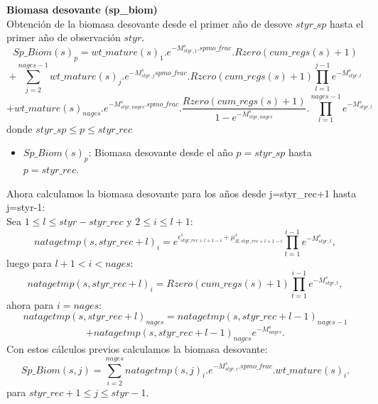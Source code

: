 \documentclass{article}
\begin{document}
\textbf{Biomasa desovante (sp\_biom)}\\
Obtención de la biomasa desovante desde el primer año de desove $styr\_sp$ hasta el primer año de observación $styr$.
\begin{equation}
    Sp\_Biom(s)_p=wt\_mature(s)_1.e^{-M^s_{styr,1}.spmo\_frac}.Rzero(cum\_regs(s)+1)
\end{equation}
\begin{equation*}
    +\sum_{j=2}^{nages-1}wt\_mature(s)_j.e^{-M^s_{styr,j} spmo\_frac}.Rzero(cum\_regs(s)+1)\prod_{l=1}^{j-1}e^{-M^s_{styr,l}} 
\end{equation*}
\begin{equation*}
    + wt\_mature(s)_{nages}.e^{-M^s_{styr,nages}.spmo\_frac}.\dfrac{Rzero(cum\_regs(s)+1)}{1-e^{-M^s_{styr,nages}}}.\prod_{l=1}^{nages-1}e^{-M^s_{styr,l}}
\end{equation*}
donde $styr\_sp\leq p \leq styr\_rec$
\begin{itemize}
    \item $Sp\_Biom(s)_p$: Biomasa desovante desde el año $p=styr\_sp$ hasta $p=styr\_rec$.
\end{itemize}

Ahora calculamos la biomasa desovante para los años desde j=styr\_rec+1 hasta j=styr-1:\\

Sea $1\leq l \leq styr-styr\_rec$ y $2\leq i \leq l+1$:
\begin{equation}
natagetmp(s,styr\_rec+l)_i = e^{\epsilon^s_{styr\_rec+l+1-i}+\mu^s_{R,styr\_rec+l+1-i}}\prod_{t=1}^{i-1}e^{-M^s_{styr,t}},
\end{equation}
luego para $l+1< i < nages$:
\begin{equation}
natagetmp(s,styr\_rec+l)_i=Rzero(cum\_regs(s)+1)\prod_{t=1}^{i-1}e^{-M^s_{styr,t}},
\end{equation}
ahora para $i=nages$:
\begin{equation}
natagetmp(s,styr\_rec+l)_{nages}=natagetmp(s,styr\_rec+l-1)_{nages-1}
\end{equation}
\begin{equation*}
    +natagetmp(s,styr\_rec+l-1)_{nages}e^{-M^s_{nages}}.
\end{equation*}
Con estos cálculos previos calculamos la biomasa desovante:
\begin{equation}
    Sp\_Biom(s, j)=\sum_{i=2}^{nages}natagetmp(s,j)_i.e^{-M^s_{styr,i}.spmo\_frac}.wt\_mature(s)_i.
\end{equation}
para $styr\_rec +1 \leq j \leq styr-1$. \\
\end{document}
